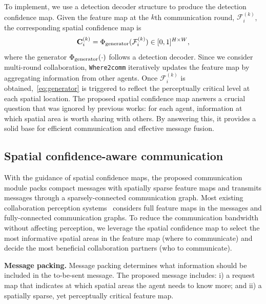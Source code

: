 To implement, we use a detection decoder structure to produce the detection confidence map. Given the feature map at the $k$th communication round, $\mathcal{F}_i^{(k)}$, the corresponding spatial confidence map is 
\vspace{-1mm}
\begin{equation}
\label{eq:generator}
    \mathbf{C}_i^{(k)}  =  \Phi_{\rm generator}(\mathcal{F}_i^{(k)})  \in [0,1]^{H \times W},
\end{equation}
where the generator $\Phi_{\rm generator}(\cdot)$ follows a detection decoder. Since we consider multi-round collaboration, \texttt{Where2comm} iteratively updates the feature map by aggregating information from other agents. Once $\mathcal{F}_i^{(k)}$ is obtained,~\eqref{eq:generator} is triggered to reflect the perceptually critical level at each spatial location. The proposed spatial confidence map answers a crucial question that was ignored by previous works: for each agent, information at which spatial area is worth sharing with others. By answering this, it provides a solid base for efficient communication and effective message fusion.

\vspace{-2mm}
\subsection{Spatial confidence-aware communication}
\label{sec:Comm}
\vspace{-2mm}
With the guidance of spatial confidence maps, the proposed communication module packs compact messages with spatially sparse feature maps and transmits messages through a sparsely-connected communication graph. Most existing collaboration perception systems~\cite{v2vnet,disconet,xu2022v2x} considers full feature maps in the messages and fully-connected communication graphs. To reduce the communication bandwidth without affecting perception, we leverage the spatial confidence map to select the most informative spatial areas in the feature map (where to communicate) and decide the most beneficial collaboration partners (who to communicate).

\textbf{Message packing.} Message packing determines what information should be included in the to-be-sent message. The proposed message includes: i) a request map that indicates at which spatial areas the agent needs to know more; and ii) a spatially sparse, yet perceptually critical feature map.

